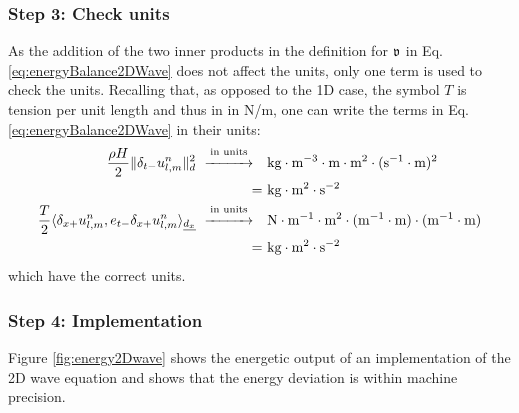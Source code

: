 \subsubsection{Step 3: Check units}
As the addition of the two inner products in the definition for $\mathfrak{v}$ in Eq. \eqref{eq:energyBalance2DWave} does not affect the units, only one term is used to check the units. Recalling that, as opposed to the 1D case, the symbol $T$ is tension per unit length and thus in in N/m, one can write the terms in Eq. \eqref{eq:energyBalance2DWave} in their units:
\begin{align*}
    \frac{\rho H}{2}\lVert \delta_{t-} u_{l,m}^n\rVert^2_d \
    \overset{\text{in units}}{\xrightarrow{\hspace*{1cm}}}    \quad&\text{kg}\cdot\text{m}^{-3}\cdot\text{m}\cdot\text{m}^2\cdot(\text{s}^{-1}\cdot\text{m})^2 \\
    = \ & \text{kg}\cdot\text{m}^2\cdot\text{s}^{-2}\\
    \frac{T}{2} \langle \delta_{x+} u_{l,m}^n, e_{t-}\delta_{x+} u_{l,m}^n\rangle_{\underline{d_x}} \
    \overset{\text{in units}}{\xrightarrow{\hspace*{1cm}}}    \quad& \text{N} \cdot \text{m}^{-1}\cdot\text{m}^2\cdot(\text{m}^{-1}\cdot\text{m})\cdot(\text{m}^{-1}\cdot\text{m})\nonumber \\
    = \ &\text{kg}\cdot\text{m}^2\cdot\text{s}^{-2}
\end{align*}
which have the correct units. 

\subsubsection{Step 4: Implementation}
Figure \ref{fig:energy2Dwave} shows the energetic output of an implementation of the 2D wave equation and shows that the energy deviation is within machine precision.

